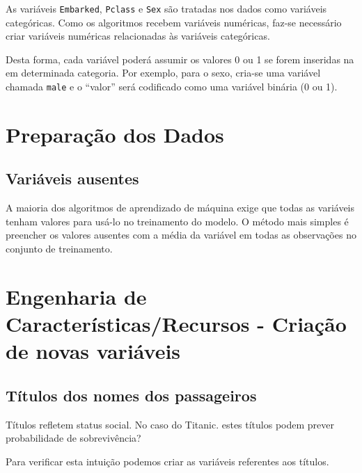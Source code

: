 \documentclass[a4paper,12pt]{report}
\begin{document}
As variáveis \texttt{Embarked}, \texttt{Pclass} e \texttt{Sex} são tratadas nos dados como variáveis categóricas. Como os algoritmos recebem variáveis numéricas, faz-se necessário criar variáveis numéricas relacionadas às variáveis categóricas. 

Desta forma, cada variável poderá assumir os valores 0 ou 1 se forem inseridas na em determinada categoria. Por exemplo, para o sexo, cria-se uma variável chamada \texttt{male} e o ``valor'' será codificado como uma variável binária (0 ou 1). \\



\section{Preparação dos Dados}

\subsection{Variáveis ausentes}

A maioria dos algoritmos de aprendizado de máquina exige que todas as variáveis tenham valores para usá-lo no treinamento do modelo. O método mais simples é preencher os valores ausentes com a média da variável em todas as observações no conjunto de treinamento.\\



\section{Engenharia de Características/Recursos - Criação de novas variáveis}



\subsection{Títulos dos nomes dos passageiros}

Títulos refletem status social. No caso do Titanic. estes títulos podem prever probabilidade de sobrevivência?

Para verificar esta intuição podemos criar as variáveis referentes aos títulos. \\


\end{document}
